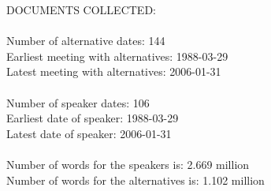 DOCUMENTS COLLECTED:\\\\Number of alternative dates: 	 	 144\\Earliest meeting with alternatives:	 	 1988-03-29 \\Latest meeting with alternatives:	 	 2006-01-31 \\ \\Number of speaker dates: 106\\Earliest date of speaker: 1988-03-29\\Latest date of speaker: 2006-01-31\\\\Number of words for the speakers is: 2.669 million \\Number of words for the alternatives is: 1.102 million \